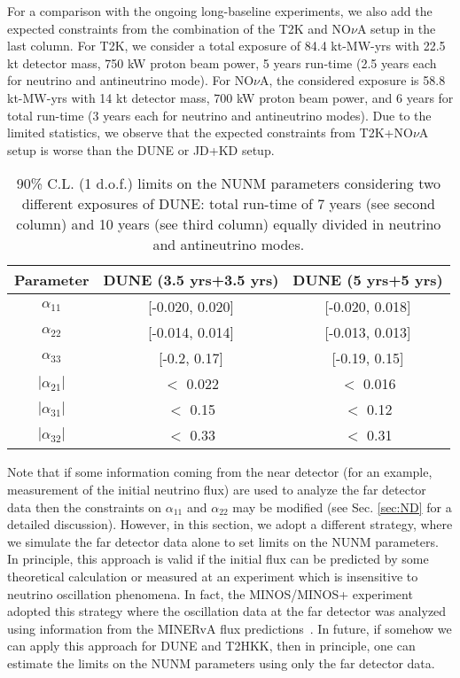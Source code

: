 \documentclass[11pt,a4paper]{article}
\newcommand{\capdef}{}
\newcommand{\mycaption}[2][\capdef]{\renewcommand{\capdef}{#2}
	\caption[#1]{{\footnotesize #2}}}
\begin{document}
For a comparison with the ongoing long-baseline experiments, we also add the expected constraints from the combination of the T2K and NO$\nu$A setup in the last column. For T2K, we consider a total exposure of 84.4 kt-MW-yrs with 22.5 kt detector mass, 750 kW proton beam power, 5 years run-time (2.5 years each for neutrino and antineutrino mode). 
 For NO$\nu$A, the considered exposure is 58.8 kt-MW-yrs with 14 kt detector mass, 700 kW proton beam power, and 6 years for total run-time (3 years each for neutrino and antineutrino modes).
Due to the limited statistics, we observe that the expected constraints from T2K+NO$\nu$A setup is worse than the DUNE or JD+KD setup. 


\begin{table}
	\centering
	\begin{tabular}{|c|c|c|}
		\hline\hline
		Parameter & DUNE (3.5 yrs+3.5 yrs)& DUNE (5 yrs+5 yrs)\\ 
		\hline
		$\alpha_{11}$& [-0.020, 0.020] & [-0.020, 0.018] \\
		\hline
		$\alpha_{22}$ & [-0.014, 0.014] & [-0.013, 0.013]\\
		\hline
		$\alpha_{33}$ & [-0.2, 0.17] & [-0.19, 0.15]\\
		\hline
		$|\alpha_{21}|$ & $<$ 0.022 & $<$ 0.016\\ 
		\hline
		$|\alpha_{31}|$ & $<$ 0.15 & $<$ 0.12\\
		\hline
		$|\alpha_{32}|$ & $<$ 0.33 & $<$ 0.31\\
		\hline\hline
	\end{tabular}
	\mycaption{
		90\% C.L. (1 d.o.f.) limits on  the NUNM parameters considering two different exposures of DUNE: total run-time of 7 years (see second column) and 10 years (see third column) equally divided in neutrino and antineutrino modes.}
	\label{tab:DUNE_runtime}
\end{table}

Note that if some information coming from the near detector (for an example, measurement of the initial neutrino flux) are used to analyze the far detector data then the constraints on $\alpha_{11}$ and $\alpha_{22}$ may be modified (see Sec. \ref{sec:ND} for a detailed discussion). 
	However, in this section, we adopt a different strategy, where we simulate the far detector data alone to set limits on the NUNM parameters. In principle, this approach is valid if the initial flux can be predicted by some theoretical calculation or measured at an experiment which is insensitive to neutrino oscillation phenomena. In fact, the MINOS/MINOS+ experiment adopted this strategy where the oscillation data at the far detector was analyzed using information from the MINERvA flux predictions~\cite{MINERvA:2016iqn}. In future, if somehow we can apply this approach for DUNE and T2HKK, then in principle, one can estimate the limits on the NUNM parameters using only the far detector data.
\end{document}

